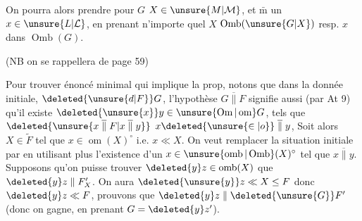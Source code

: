  On pourra alors prendre pour $G$  $X\in\unsure{M|\mathcal M}$, et $\bar{\text{m}}$ un $x\in\unsure{L|\mathcal L}$,  en prenant n'importe quel $X$  $\operatorname{Omb}(\unsure{G|X})$ resp.  $x$ dans $\operatorname{Omb}(G)$.

(NB on se rappellera de  page 59)

Pour trouver  énoncé minimal qui implique la prop, notons que dans la donnée initiale, $\deleted{\unsure{d|F}}G$, l'hypothèse $G\mathrel{\overline{\parallel}}F$ signifie aussi (par At 9) qu'il existe $\deleted{\unsure{x}}y\in\unsure{\operatorname{Om}|\operatorname{om}}G$,  tels que $\deleted{\unsure{x\mathrel{\overline{\parallel}}F|x\mathrel{\overline{\parallel}}y}}$ $x\deleted{\unsure{\in|o}}\mathrel{\overline{\parallel}}y$,  Soit alors $X\in\widetilde F$ tel que $x\in\operatorname{om}(X)^{\circ}$ i.e. $x\ll X$.
On veut remplacer la situation initiale par
en utilisant   plus l'existence d'un $x\in\unsure{\operatorname{omb}|\operatorname{Omb}}(X)^\circ$ tel que $x\mathrel{\overline{\parallel}}y$. Supposons qu'on puisse trouver $\deleted{y}z\in\operatorname{omb}(X)$  que $\deleted{y}z\parallel F'_X$. On aura $\deleted{\unsure{y}}z\ll X\leq F$ donc $\deleted{y}z\ll F$, prouvons que $\deleted{y}z\parallel\deleted{\unsure{G}}F'$ (donc on gagne, en prenant $G=\deleted{y}z'$).


